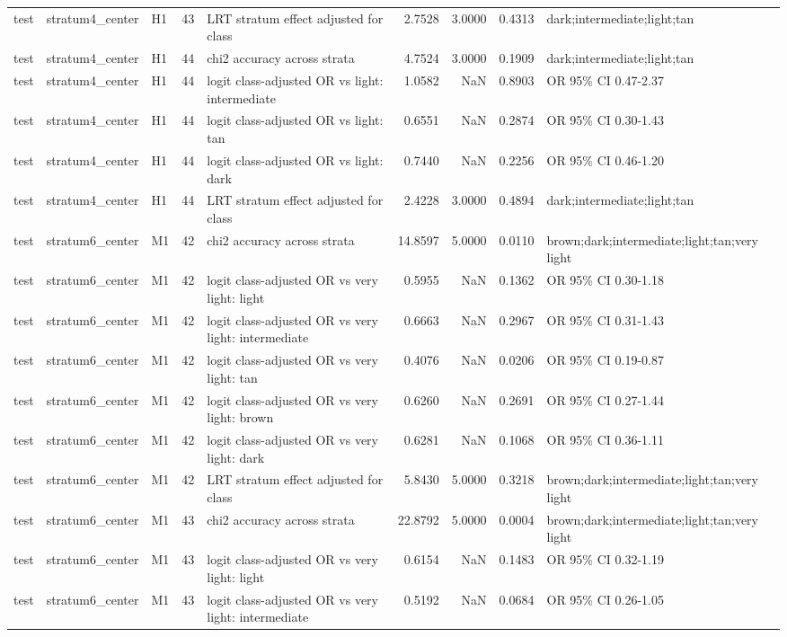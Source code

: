 \begin{tabular}{lllrlrrrl}
test & stratum4\_center & H1 & 43 & LRT stratum effect adjusted for class & 2.7528 & 3.0000 & 0.4313 & dark;intermediate;light;tan \\
test & stratum4\_center & H1 & 44 & chi2 accuracy across strata & 4.7524 & 3.0000 & 0.1909 & dark;intermediate;light;tan \\
test & stratum4\_center & H1 & 44 & logit class-adjusted OR vs light: intermediate & 1.0582 & NaN & 0.8903 & OR 95\% CI 0.47-2.37 \\
test & stratum4\_center & H1 & 44 & logit class-adjusted OR vs light: tan & 0.6551 & NaN & 0.2874 & OR 95\% CI 0.30-1.43 \\
test & stratum4\_center & H1 & 44 & logit class-adjusted OR vs light: dark & 0.7440 & NaN & 0.2256 & OR 95\% CI 0.46-1.20 \\
test & stratum4\_center & H1 & 44 & LRT stratum effect adjusted for class & 2.4228 & 3.0000 & 0.4894 & dark;intermediate;light;tan \\
test & stratum6\_center & M1 & 42 & chi2 accuracy across strata & 14.8597 & 5.0000 & 0.0110 & brown;dark;intermediate;light;tan;very light \\
test & stratum6\_center & M1 & 42 & logit class-adjusted OR vs very light: light & 0.5955 & NaN & 0.1362 & OR 95\% CI 0.30-1.18 \\
test & stratum6\_center & M1 & 42 & logit class-adjusted OR vs very light: intermediate & 0.6663 & NaN & 0.2967 & OR 95\% CI 0.31-1.43 \\
test & stratum6\_center & M1 & 42 & logit class-adjusted OR vs very light: tan & 0.4076 & NaN & 0.0206 & OR 95\% CI 0.19-0.87 \\
test & stratum6\_center & M1 & 42 & logit class-adjusted OR vs very light: brown & 0.6260 & NaN & 0.2691 & OR 95\% CI 0.27-1.44 \\
test & stratum6\_center & M1 & 42 & logit class-adjusted OR vs very light: dark & 0.6281 & NaN & 0.1068 & OR 95\% CI 0.36-1.11 \\
test & stratum6\_center & M1 & 42 & LRT stratum effect adjusted for class & 5.8430 & 5.0000 & 0.3218 & brown;dark;intermediate;light;tan;very light \\
test & stratum6\_center & M1 & 43 & chi2 accuracy across strata & 22.8792 & 5.0000 & 0.0004 & brown;dark;intermediate;light;tan;very light \\
test & stratum6\_center & M1 & 43 & logit class-adjusted OR vs very light: light & 0.6154 & NaN & 0.1483 & OR 95\% CI 0.32-1.19 \\
test & stratum6\_center & M1 & 43 & logit class-adjusted OR vs very light: intermediate & 0.5192 & NaN & 0.0684 & OR 95\% CI 0.26-1.05 \\

\end{tabular}
